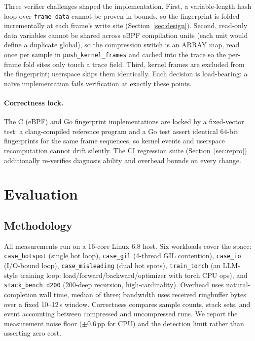 \documentclass[letterpaper,twocolumn,10pt]{article}
\begin{document}
Three verifier challenges shaped the implementation. First, a
variable-length hash loop over \texttt{frame\_data} cannot be proven
in-bounds, so the fingerprint is folded incrementally at each frame's write
site (Section~\ref{sec:design}). Second, read-only data variables cannot be
shared across eBPF compilation units (each unit would define a duplicate
global), so the compression switch is an ARRAY map, read once per sample in
\texttt{push\_kernel\_frames} and cached into the trace so the per-frame
fold sites only touch a trace field. Third, kernel frames are excluded from
the fingerprint; userspace skips them identically. Each decision is
load-bearing: a na\"ive implementation fails verification at exactly these
points.

\paragraph{Correctness lock.}
The C (eBPF) and Go fingerprint implementations are locked by a
fixed-vector test: a clang-compiled reference program and a Go test assert
identical 64-bit fingerprints for the same frame sequences, so kernel
events and userspace recomputation cannot drift silently. The CI regression
suite (Section~\ref{sec:repro}) additionally re-verifies diagnosis ability
and overhead bounds on every change.

\section{Evaluation}
\label{sec:eval}

\subsection{Methodology}
All measurements run on a 16-core Linux 6.8 host. Six workloads cover the
space: \texttt{case\_hotspot} (single hot loop), \texttt{case\_gil}
(4-thread GIL contention), \texttt{case\_io} (I/O-bound loop),
\texttt{case\_misleading} (dual hot spots), \texttt{train\_torch} (an
LLM-style training loop: load/forward/backward/optimizer with torch CPU
ops), and \texttt{stack\_bench d200} (200-deep recursion,
high-cardinality). Overhead uses natural-completion wall time, median of
three; bandwidth uses received ringbuffer bytes over a fixed 10--12\,s
window. Correctness compares sample counts, stack sets, and event
accounting between compressed and uncompressed runs. We report the
measurement noise floor ($\pm$0.6\,pp for CPU) and the detection limit
rather than asserting zero cost.
\end{document}
